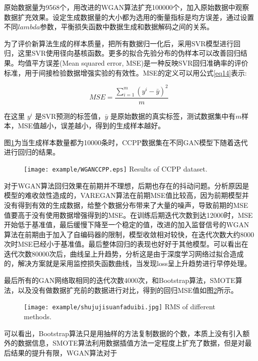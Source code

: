 原始数据量为9568个，用改进的WGAN算法扩充100000个，加入原始数据中观察数据扩充效果。设定生成数据量的大小都为选用的衡量指标是均方误差，通过设置不同$lambda$参数，平衡损失函数中数据生成和数据解码之间的关系。

为了评价新算法生成的样本质量，把所有数据归一化后，采用SVR模型进行回归，这里SVR使用径向基核函数。更多的拟合先验分布的伪样本可以改善回归结果。均值平方误差(Mean squared error, MSE)是一种反映SVR回归准确率的评价标准，用于间接检验数据增强实验的有效性。MSE的定义可以用公式\ref{eq14}表示:

\begin{equation}
\label{eq14}
MSE=\frac{\sum \limits_{i=1}^m (y^{i}-\bar{y})^{2}}{m}
\end{equation}

在这里 $y^{i}$ 是SVR预测的标签值，$\bar{y}$ 是原始数据的真实标签，测试数据集中有$m$样本，MSE值越小，误差越小，得到的生成样本越好。

图\ref{figCCPP}为当生成样本数量都为10000条时，CCPP数据集在不同GAN模型下随着迭代进行回归的结果。
\begin{figure}[htbp]
	\centering
	\texttt{[image: example/WGANCCPP.eps]}
	{Results of CCPP dataset.}
	\label{figCCPP}
\end{figure}

对于WGAN算法回归效果在前期并不理想，后期也存在的抖动问题。分析原因是模型的难收敛性造成的，VAREGAN算法在前期MSE值比较高，因为前期模型并没有得到有效的生成数据，给整个数据分布带来了大量的噪声，导致前期的MSE值要高于没有使用数据增强得到的MSE。在训练后期迭代次数到达12000时，MSE开始低于基准值，最后缓慢下降至一个稳定的值，改进的加入监督信号的WGAN算法在前期由于加入了自编码器的限制，模型收敛相对较快，在迭代次数大约8000次时MSE已经小于基准值。最后整体回归的表现也好好于其他模型。可以看出在迭代次数80000次后，曲线呈上升趋势，分析这是由于深度学习网络过拟合造成的，解决方案就是采用监控损失函数曲线，当发现loss呈上升趋势进行早停处理。

最后所有的GAN网络取相同的迭代次数4000次，和Bootstrap算法，SMOTE算法，以及没有做数据扩充前的数据进行对比，得到的回归MSE值如图\ref{fig:MSE}所示。

\begin{figure}[htpb]
	\centering
	\texttt{[image: example/shujujisuanfaduibi.jpg]}
	{RMS of different methods.}
	\label{fig:MSE}
\end{figure}

可以看出，Bootstrap算法只是用抽样的方法复制数据的个数，本质上没有引入额外的数据信息，SMOTE算法利用数据插值方法一定程度上扩充了数据，但是对最后结果的提升有限，WGAN算法对于


